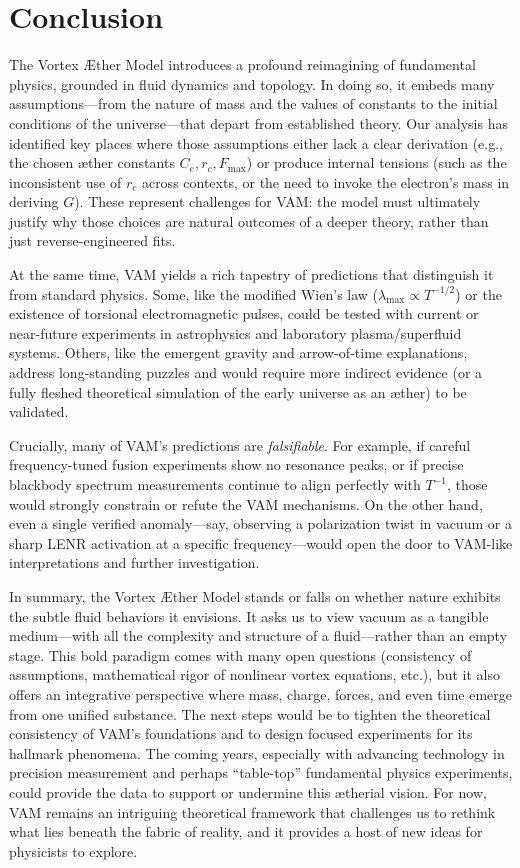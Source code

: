 \documentclass[a4paper,12pt]{article}
\begin{document}
\section*{Conclusion}

The Vortex Æther Model introduces a profound reimagining of fundamental physics, grounded in fluid dynamics and topology. In doing so, it embeds many assumptions---from the nature of mass and the values of constants to the initial conditions of the universe---that depart from established theory. Our analysis has identified key places where those assumptions either lack a clear derivation (e.g., the chosen æther constants $C_e, r_c, F_{\max}$) or produce internal tensions (such as the inconsistent use of $r_c$ across contexts, or the need to invoke the electron’s mass in deriving $G$). These represent challenges for VAM: the model must ultimately justify why those choices are natural outcomes of a deeper theory, rather than just reverse-engineered fits.

At the same time, VAM yields a rich tapestry of predictions that distinguish it from standard physics. Some, like the modified Wien’s law ($\lambda_{\max}\propto T^{-1/2}$) or the existence of torsional electromagnetic pulses, could be tested with current or near-future experiments in astrophysics and laboratory plasma/superfluid systems. Others, like the emergent gravity and arrow-of-time explanations, address long-standing puzzles and would require more indirect evidence (or a fully fleshed theoretical simulation of the early universe as an æther) to be validated.

Crucially, many of VAM’s predictions are \textit{falsifiable}. For example, if careful frequency-tuned fusion experiments show no resonance peaks, or if precise blackbody spectrum measurements continue to align perfectly with $T^{-1}$, those would strongly constrain or refute the VAM mechanisms. On the other hand, even a single verified anomaly---say, observing a polarization twist in vacuum or a sharp LENR activation at a specific frequency---would open the door to VAM-like interpretations and further investigation.

In summary, the Vortex Æther Model stands or falls on whether nature exhibits the subtle fluid behaviors it envisions. It asks us to view vacuum as a tangible medium---with all the complexity and structure of a fluid---rather than an empty stage. This bold paradigm comes with many open questions (consistency of assumptions, mathematical rigor of nonlinear vortex equations, etc.), but it also offers an integrative perspective where mass, charge, forces, and even time emerge from one unified substance. The next steps would be to tighten the theoretical consistency of VAM’s foundations and to design focused experiments for its hallmark phenomena. The coming years, especially with advancing technology in precision measurement and perhaps “table-top” fundamental physics experiments, could provide the data to support or undermine this ætherial vision. For now, VAM remains an intriguing theoretical framework that challenges us to rethink what lies beneath the fabric of reality, and it provides a host of new ideas for physicists to explore.



    
    
\end{document}
